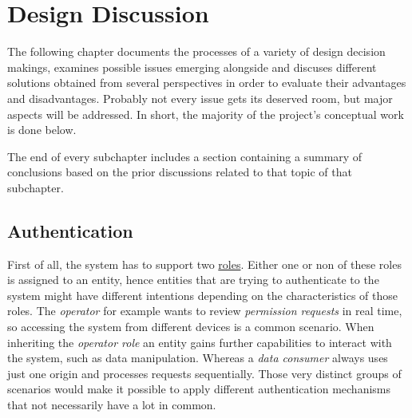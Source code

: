 \documentclass[12pt,english,a4paper,titlepage,cleardoublepage=empty,dottedtoc]{report}
\begin{document}
\hypertarget{design-discussion}{\chapter{Design
Discussion}\label{design-discussion}}

The following chapter documents the processes of a variety of design
decision makings, examines possible issues emerging alongside and
discuses different solutions obtained from several perspectives in order
to evaluate their advantages and disadvantages. Probably not every issue
gets its deserved room, but major aspects will be addressed. In short,
the majority of the project's conceptual work is done below.

The end of every subchapter includes a section containing a summary of
conclusions based on the prior discussions related to that topic of that
subchapter.

\hypertarget{authentication}{\section{Authentication}\label{authentication}}

First of all, the system has to support two
\protect\hyperlink{sa03}{roles}. Either one or non of these roles is
assigned to an entity, hence entities that are trying to authenticate to
the system might have different intentions depending on the
characteristics of those roles. The \emph{operator} for example wants to
review \emph{permission requests} in real time, so accessing the system
from different devices is a common scenario. When inheriting the
\emph{operator role} an entity gains further capabilities to interact
with the system, such as data manipulation. Whereas a \emph{data
consumer} always uses just one origin and processes requests
sequentially. Those very distinct groups of scenarios would make it
possible to apply different authentication mechanisms that not
necessarily have a lot in common.
\end{document}
